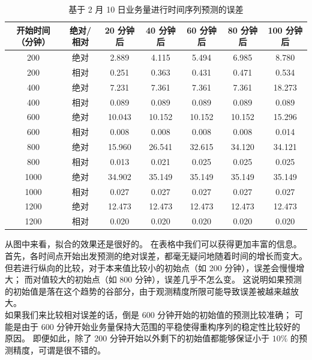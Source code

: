 \documentclass[a4paper]{article}
\begin{document}
\begin{table}[htbp]
	\centering
	\caption{基于 2 月 10 日业务量进行时间序列预测的误差}
	\label{tab:ssa_error}
	\begin{tabular}{cc|ccccc}
		\hline
		开始时间（分钟） & 绝对/相对 & 20 分钟后 & 40 分钟后 & 60 分钟后 & 80 分钟后  & 100 分钟后 \\
		\hline
		200 & 绝对 & 2.889 & 4.115 & 5.494 & 6.985 & 8.780 \\
		200 & 相对 & 0.251 & 0.363 & 0.431 & 0.471 & 0.534 \\
		\hline
		400 & 绝对 & 7.231 & 7.361 & 7.361 & 7.361 & 18.273 \\
		400 & 相对 & 0.089 & 0.089 & 0.089 & 0.089 & 0.089 \\
		\hline
		600 & 绝对 & 10.043 & 10.152 & 10.152 & 10.152 & 15.296 \\
		600 & 相对 & 0.008 & 0.008 & 0.008 & 0.008 & 0.014 \\
		\hline
		800 & 绝对 & 15.960 & 26.541 & 32.615 & 34.120 & 34.121 \\
		800 & 相对 & 0.013 & 0.021 & 0.025 & 0.025 & 0.025 \\
		\hline
		1000 & 绝对 & 34.902 & 35.149 & 35.149 & 35.149 & 35.149 \\
		1000 & 相对 & 0.027 & 0.027 & 0.027 & 0.027 & 0.027 \\
		\hline
		1200 & 绝对 & 12.473 & 12.473 & 12.473 & 12.473 & 12.473 \\
		1200 & 相对 & 0.020 & 0.020 & 0.020 & 0.020 & 0.020 \\
		\hline
	\end{tabular}
\end{table}
\newline
\indent 从图中来看，拟合的效果还是很好的。
在表格中我们可以获得更加丰富的信息。
首先，各时间点开始出发预测的绝对误差，都毫无疑问地随着时间的增长而变大。
但若进行纵向的比较，对于本来值比较小的初始点（如 200 分钟），误差会慢慢增大；
而对值较大的初始点（如 800 分钟），误差几乎不怎么变。
这说明如果预测的初始值是落在这个趋势的谷部分，由于观测精度所限可能导致误差被越来越放大。
\\
\indent 如果我们来比较相对误差的话，倒是 600 分钟开始的初始值的预测比较准确；
可能是由于 600 分钟开始业务量保持大范围的平稳使得重构序列的稳定性比较好的原因。
即便如此，除了 200 分钟开始以外剩下的初始值都能够保证小于 $10\%$ 的预测精度，可谓是很不错的。
\end{document}

